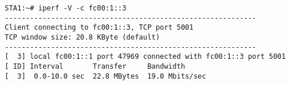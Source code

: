 \begin{lstlisting}
STA1:~# iperf -V -c fc00:1::3
------------------------------------------------------------
Client connecting to fc00:1::3, TCP port 5001
TCP window size: 20.8 KByte (default)
------------------------------------------------------------
[  3] local fc00:1::1 port 47969 connected with fc00:1::3 port 5001
[ ID] Interval       Transfer     Bandwidth
[  3]  0.0-10.0 sec  22.8 MBytes  19.0 Mbits/sec
\end{lstlisting}
